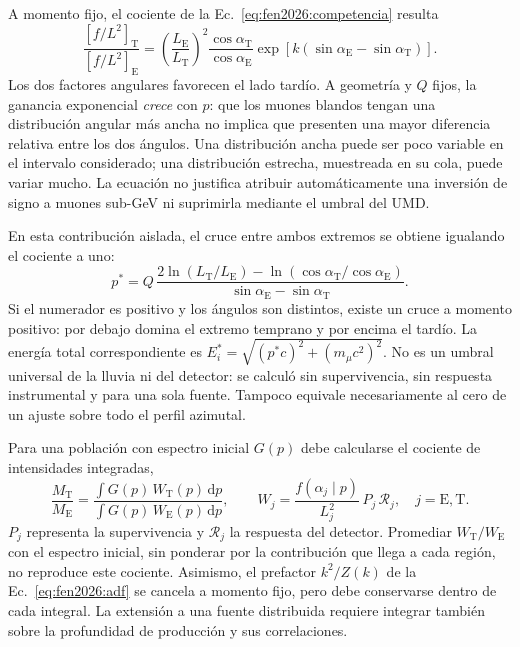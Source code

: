 A momento fijo, el cociente de la Ec.~\ref{eq:fen2026:competencia} resulta
\begin{equation}
\frac{[f/L^2]_{\mathrm T}}{[f/L^2]_{\mathrm E}}
=\left(\frac{L_{\mathrm E}}{L_{\mathrm T}}\right)^2
\frac{\cos\alpha_{\mathrm T}}{\cos\alpha_{\mathrm E}}
\exp\left[k(\sin\alpha_{\mathrm E}-\sin\alpha_{\mathrm T})\right].
\label{eq:fen2026:cociente}
\end{equation}
Los dos factores angulares favorecen el lado tardío. A geometría y $Q$ fijos, la ganancia exponencial \emph{crece} con $p$: que los muones blandos tengan una distribución angular más ancha no implica que presenten una mayor diferencia relativa entre los dos ángulos. Una distribución ancha puede ser poco variable en el intervalo considerado; una distribución estrecha, muestreada en su cola, puede variar mucho. La ecuación no justifica atribuir automáticamente una inversión de signo a muones sub-GeV ni suprimirla mediante el umbral del UMD.

En esta contribución aislada, el cruce entre ambos extremos se obtiene
igualando el cociente a uno:
\begin{equation}
p^\ast=Q\,
\frac{2\ln(L_{\mathrm T}/L_{\mathrm E})
-\ln(\cos\alpha_{\mathrm T}/\cos\alpha_{\mathrm E})}
{\sin\alpha_{\mathrm E}-\sin\alpha_{\mathrm T}}.
\label{eq:fen2026:cruce}
\end{equation}
Si el numerador es positivo y los ángulos son distintos, existe un cruce
a momento positivo: por debajo domina el extremo temprano y por encima
el tardío. La energía total correspondiente es
$E_i^\ast=\sqrt{(p^\ast c)^2+(m_\mu c^2)^2}$.
No es un umbral universal de la lluvia ni del detector: se calculó sin
supervivencia, sin respuesta instrumental y para una sola fuente. Tampoco
equivale necesariamente al cero de un ajuste sobre todo el perfil azimutal.

Para una población con espectro inicial $G(p)$ debe calcularse el cociente de intensidades integradas,
\begin{equation}
\frac{M_{\mathrm T}}{M_{\mathrm E}}
=\frac{\int G(p)\,W_{\mathrm T}(p)\,\mathrm dp}
       {\int G(p)\,W_{\mathrm E}(p)\,\mathrm dp},
\qquad
W_j=\frac{f(\alpha_j\mid p)}{L_j^2}\,
P_j\,\mathcal R_j,\quad j=\mathrm E,\mathrm T.
\label{eq:fen2026:integrales}
\end{equation}
$P_j$ representa la supervivencia y $\mathcal R_j$ la respuesta del detector. Promediar $W_{\mathrm T}/W_{\mathrm E}$ con el espectro inicial, sin ponderar por la contribución que llega a cada región, no reproduce este cociente. Asimismo, el prefactor $k^2/Z(k)$ de la Ec.~\ref{eq:fen2026:adf} se cancela a momento fijo, pero debe conservarse dentro de cada integral. La extensión a una fuente distribuida requiere integrar también sobre la profundidad de producción y sus correlaciones.

